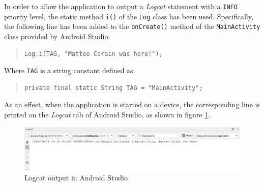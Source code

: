 \documentclass[letterpaper,headings=standardclasses]{scrartcl}
\begin{document}
In order to allow the application to output a \emph{Logcat} statement with a \texttt{INFO} priority level, the static method \texttt{i()} of the \texttt{Log} class has been used. Specifically, the following line has been added to the \texttt{onCreate()} method of the \texttt{MainActivity} class provided by Android Studio:

\begin{quote}
\begin{verbatim}
Log.i(TAG, "Matteo Corain was here!");
\end{verbatim}
\end{quote}

Where \texttt{TAG} is a string constant defined as:

\begin{quote}
\begin{verbatim}
private final static String TAG = "MainActivity";
\end{verbatim}
\end{quote}

As an effect, when the application is started on a device, the corresponding line is printed on the \emph{Logcat} tab of Android Studio, as shown in figure \ref{logcat}.

\begin{figure}[H]
  \centering
  \includegraphics[width=.9\linewidth]{04_logcat.png}
  \caption{Logcat output in Android Studio}
  \label{logcat}
\end{figure}
\end{document}
